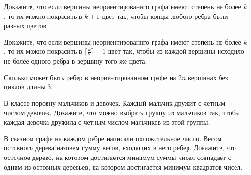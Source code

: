 \setcounter{curtask}{30}



\begin{task}
    Докажите, что если вершины неориентированнго графа имеют степень не более $k$,
    то их можно покрасить в $k + 1$ цвет так, чтобы концы любого ребра были разных цветов.
\end{task}

\begin{task}
    Докажите, что если вершины неориентированнго графа имеют степень не более $k$,
    то их можно покрасить в $\lceil \frac{k}{2} \rceil + 1$ цвет так, чтобы из
    каждой вершины исходило не более одного ребра в вершину того же цвета.
\end{task}

\begin{task}
    Сколько может быть ребер в неориентированном графе на $2n$ вершинах без циклов
    длины $3$.
\end{task}

\begin{task}
    В классе поровну мальчиков и девочек. Каждый мальчик дружит с четным числом
    девочек. Докажите, что можно выбрать группу из мальчиков так, чтобы каждая
    девочка дружила с четным числом мальчиков из этой группы.
\end{task}

\begin{task}
    В связном графе на каждом ребре написали положительное число. Весом остовного
    дерева назовем сумму весов, входящих в него ребер. Докажите, что осточное дерево,
    на котором достигается минимум суммы чисел совпадает с одним из остовных
    деревьев, на котором достигается минимум квадратов чисел.
\end{task}